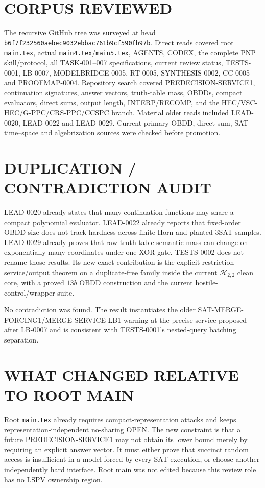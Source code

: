 \documentclass[11pt]{article}
\begin{document}
\section{CORPUS REVIEWED}
The recursive GitHub tree was surveyed at head
\texttt{b6f7f232560aebec9032ebbac761b9cf590fb97b}.  Direct reads covered root
\texttt{main.tex}, actual \texttt{main4.tex}/\texttt{main5.tex}, AGENTS,
CODEX, the complete PNP skill/protocol, all TASK-001--007 specifications,
current review status, TESTS-0001, LB-0007, MODELBRIDGE-0005, RT-0005,
SYNTHESIS-0002, CC-0005 and PROOFMAP-0004.  Repository search covered
PREDECISION-SERVICE1, continuation signatures, answer vectors, truth-table
mass, OBDDs, compact evaluators, direct sums, output length, INTERP/RECOMP,
and the HEC/VSC-HEC/G-PPC/CRS-PPC/CCSPC branch.  Material older reads
included LEAD-0020, LEAD-0022 and LEAD-0029.  Current primary OBDD,
direct-sum, SAT time--space and algebrization sources were checked before
promotion.

\section{DUPLICATION / CONTRADICTION AUDIT}
LEAD-0020 already states that many continuation functions may share a compact
polynomial evaluator.  LEAD-0022 already reports that fixed-order OBDD size
does not track hardness across finite Horn and planted-3SAT samples.
LEAD-0029 already proves that raw truth-table semantic mass can change on
exponentially many coordinates under one XOR gate.  TESTS-0002 does not
rename those results.  Its new exact contribution is the explicit
restriction-service/output theorem on a duplicate-free family inside the
current $\mathcal H_{2,2}$ clean core, with a proved $13b$ OBDD construction
and the current hostile-control/wrapper suite.

No contradiction was found.  The result instantiates the older
SAT-MERGE-FORCING1/MERGE-SERVICE-LB1 warning at the precise service proposed
after LB-0007 and is consistent with TESTS-0001's nested-query batching
separation.

\section{WHAT CHANGED RELATIVE TO ROOT MAIN}
Root \texttt{main.tex} already requires compact-representation attacks and
keeps representation-independent no-sharing OPEN.  The new constraint is
that a future PREDECISION-SERVICE1 may not obtain its lower bound merely by
requiring an explicit answer vector.  It must either prove that succinct
random access is insufficient in a model forced by every SAT execution, or
choose another independently hard interface.  Root main was not edited
because this review role has no LSPV ownership region.
\end{document}
